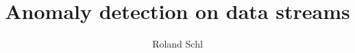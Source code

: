 \documentclass{ddis-thesis}
\author{Roland Schl\äfli}
\title{Anomaly detection on data streams}
\begin{document}

\frontmatter



\tableofcontents



\mainmatter

\renewcommand{\arraystretch}{1}








\end{document}
